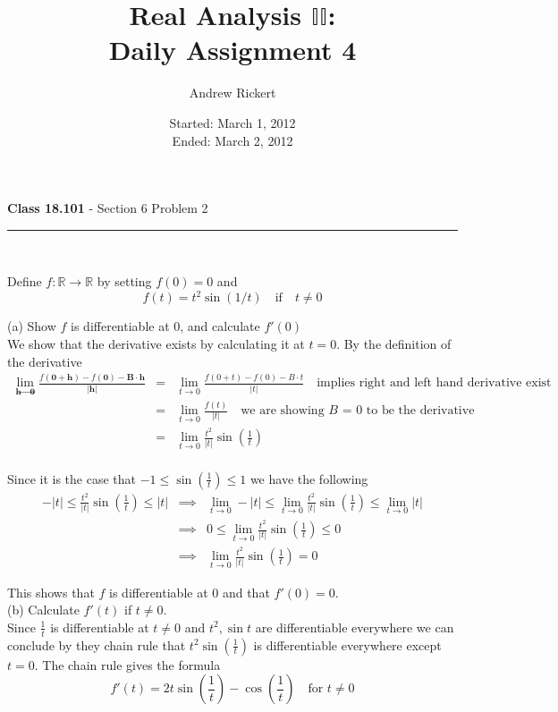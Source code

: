 \documentclass[11pt,reqno]{article}
\title{Real Analysis $\mathbb{II}$: \\ Daily Assignment 4}
\author{Andrew Rickert}
\date{Started: March 1, 2012 \\ \hspace{1pt} Ended: March 2,  2012}                                           %
\begin{document}
\maketitle

\begin{flushleft} 
\textbf{Class 18.101} - Section 6 Problem 2\\
\rule{500pt}{1pt}\\
\end{flushleft} 

\noindent Define $f: \mathbb{R} \to \mathbb{R}$ by setting $f(0) = 0$ and
\[ f(t) = t^2 \sin(1/t) \quad \text{if} \quad t \neq 0 \]

\noindent (a) Show $f$ is differentiable at $0$, and calculate $f'(0)$\\

We show that the derivative exists by calculating it at $t = 0$. By the definition of the derivative
\begin{eqnarray*}
\lim_{\textbf{h} \to \textbf{0}} \frac{f(\textbf{0} + \textbf{h}) - f(\textbf{0}) - \textbf{B}\cdot \textbf{h}}{|\textbf{h}|} &=&  \lim_{t \to 0} \frac{f(0 + t) - f(0) - B \cdot t}{|t|} \quad \text{implies right and left hand derivative exist}\\
&=& \lim_{t \to 0} \frac{f(t)}{|t|} \quad \text{we are showing $B$ = 0 to be the derivative}\\
&=& \lim_{t \to 0} \frac{t^2}{|t|} \sin(\frac{1}{t})\\
\end{eqnarray*}

\noindent Since it is the case that $-1 \le \sin(\frac{1}{t}) \le 1$ we have the following
\begin{eqnarray*}
-|t| \le \frac{t^2}{|t|} \sin(\frac{1}{t}) \le |t| &\implies& \lim_{t \to 0} -|t| \le \lim_{t \to 0} \frac{t^2}{|t|} \sin(\frac{1}{t}) \le \lim_{t \to 0} |t| \\
& \implies & 0 \le \lim_{t \to 0} \frac{t^2}{|t|} \sin(\frac{1}{t}) \le 0 \\
& \implies & \lim_{t \to 0} \frac{t^2}{|t|} \sin(\frac{1}{t}) = 0
\end{eqnarray*}

\noindent This shows that $f$ is differentiable at 0 and that $f'(0) = 0$.\\

\noindent (b) Calculate $f'(t)$ if $t \neq 0$.\\

Since $\frac{1}{t}$ is differentiable at $t \neq 0$ and $t^2, \sin t$ are differentiable everywhere we can conclude by they chain rule that $t^2 \sin (\frac{1}{t} )$ is differentiable everywhere except $t = 0$. The chain rule gives the formula
\[ f'(t) = 2t \sin( \frac{1}{t} ) - \cos(\frac{1}{t}) \quad \text{for $t \neq 0$}\]
\end{document}
